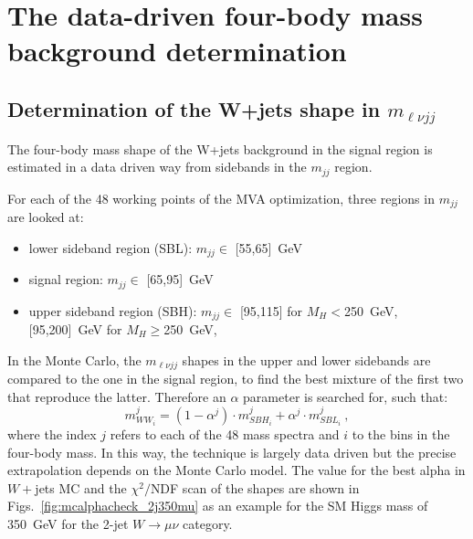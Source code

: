 \section{The data-driven four-body mass background determination}
\label{sec:wjetsBackground}


\subsection{Determination of the W+jets shape in \texorpdfstring{$m_{\ell{}\nu{}jj}$}{Four-body Invariant Mass}}
\label{sec:alphaExtraction}

The four-body mass shape of the W+jets background in the signal region
is estimated in a data driven way from sidebands in the $m_{jj}$ region.

For each of the 48 working points of the MVA optimization,
three regions in $m_{jj}$ are looked at:
\begin{itemize}
\item lower sideband region (SBL):  $m_{jj} \in$ [55,65]~GeV
\item signal region: $m_{jj} \in $ [65,95]~GeV
\item upper sideband region (SBH): $m_{jj} \in$ [95,115] for $M_H<$250~GeV, [95,200]~GeV  for $M_H\ge$250~GeV, 
\end{itemize}

In the Monte Carlo,
the $m_{\ell\nu jj}$ shapes in the upper and lower sidebands
are compared to the one in the signal region,
to find the best mixture of the first two that reproduce the latter.
Therefore an $\alpha$ parameter is searched for, such that:
\begin{equation}
m_{WW_i}^{j} = (1-\alpha^j) \cdot m_{SBH_i}^j + \alpha^j \cdot  m_{SBL_i}^j~,
\label{EqnAlpha}
\end{equation}
where the index $j$ refers to each of the 48 mass spectra and $i$ to
the bins in the four-body mass.  In this way, the technique is largely
data driven but the precise extrapolation depends on the Monte Carlo
model. The value for the best alpha in $W+$jets MC and the $\chi^2/$NDF
scan of the shapes are shown in Figs.~\ref{fig:mcalphacheck_2j350mu}
as an example for the SM Higgs mass of 350~GeV for the 2-jet
$W\to\mu\nu$ category.

